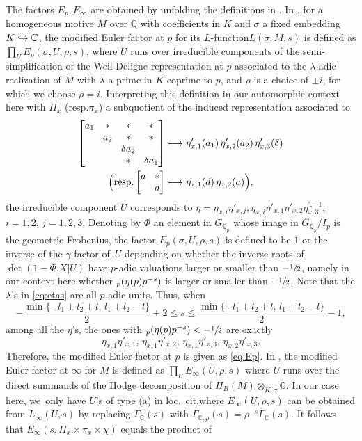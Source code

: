 \documentclass[10pt]{amsart}
\newcommand{\resp}{resp.}
\newcommand{\loccit}{loc.\ cit.}
\newcommand{\NoChangel}[1]{%
\expandafter\let\csname old\string#1\endcsname=#1
\let#1=\relax
\newcommand{#1}{\mathop{\mathcode`l="716C\csname old\string#1\endcsname\mathcode`l="7160}\displaylimits}%
}
\newcommand\mto{\mathchoice{\longmapsto}{\mapsto}{\mapsto}{\mapsto}}
\newcommand\hto{\mathrel{\lhook\joinrel\to}}
\newcommand{\Lfunction}{$L$\nobreakdash-func\-tion\xspace}
\theoremstyle{plain}
\theoremstyle{remark}
\newcommand{\bC}{\mathbb{C}}
\newcommand{\bQ}{\mathbb{Q}}
\newcommand{\val}{\mathrm{val}}\NoChangel{\val}
\begin{document}
The factors $E_p,E_\infty$ are obtained by unfolding the definitions in \cite{CoPerrin,Coates}. In \cite[p.\,163]{Coates}, for a homogeneous motive $M$ over $\bQ$ with coefficients in $K$ and $\sigma$ a fixed embedding $K\hto\bC$, the modified Euler factor at $p$ for its \Lfunction $L(\sigma,M,s)$ is defined as $\prod\nolimits_{U} E_p(\sigma,U,\rho,s)$, where $U$ runs over irreducible components of the semi-simplification of the Weil-Deligne representation at $p$ associated to the $\lambda$-adic realization of $M$ with $\lambda$ a prime in $K$ coprime to $p$, and $\rho$ is a choice of $\pm i$, for which we choose $\rho=i$. Interpreting this definition in our automorphic context here with $\Pi_x$ (\resp $\pi_x$) a subquotient of the induced representation associated to
\begin{align*}\arraycolsep4.5pt
\begin{bmatrix} a_1&\ast&\ast&\ast\\& a_2&\ast&\ast\\ &&\delta a_2\\&&\ast&\delta a_1\end{bmatrix}&\mto \eta'_{x,1}(a_1)\,\eta'_{x,2}(a_2)\,\eta'_{x,3}(\delta)\\
\arraycolsep4.5pt
\Bigl(\text{\resp }\begin{bmatrix}a&\ast\\&d\end{bmatrix}&\mto \eta_{x,1}(d)\,\eta_{x,2}(a)\Bigr),
\end{align*}
the irreducible component $U$ corresponds to $\eta=\eta_{x,i}\eta'_{x,j},\eta_{x,i}\eta'_{x,1}\eta'_{x,2}\eta^{\prime,-1}_{x,3}$, $i=1,2$, $j=1,2,3$. Denoting by $\Phi$ an element in $G_{\bQ_p}$ whose image in $G_{\bQ_p}/I_p$ is the geometric Frobenius, the factor $E_p(\sigma,U,\rho,s)$ is defined to be $1$ or the inverse of the $\gamma$-factor of~$U$ depending on whether the inverse roots of $\det(1-\Phi.X|U)$ have $p$-adic valuations larger or smaller than $-\sfrac{1}{2}$, namely in our context here whether $\val_p(\eta(p)p^{-s})$ is larger or smaller than $-\sfrac{1}{2}$. Note that the $\lambda$'s in \eqref{eq:etas} are all $p$-adic units. Thus, when
\[
-\frac{\min\{-l_1+l_2+l,\,l_1+l_2-l\}}{2}+2 \leq s\leq \frac{\min\{-l_1+l_2+l,\,l_1+l_2-l\}}{2}-1,
\]
among all the $\eta$'s, the ones with $\val_p(\eta(p)p^{-s})<-\sfrac{1}{2}$ are exactly
\[
\eta_{x,1}\eta'_{x,1},\,\eta_{x,1}\eta'_{x,2},\,\eta_{x,1}\eta'_{x,3},\,\eta_{x,2}\eta'_{x,3}.
\]
Therefore, the modified Euler factor at $p$ is given as \eqref{eq:Ep}. In \cite[(38) on p.\,157]{Coates}, the modified Euler factor at $\infty$ for $M$ is defined as $\prod_U E_\infty(U,\rho,s)$ where $U$ runs over the direct summands of the Hodge decomposition of $H_B(M)\otimes_{K,\sigma}\bC$. In our case here, we~only have $U$'s of type (a) in \loccit where $E_\infty(U,\rho,s)$ can be obtained from $L_\infty(U,s)$ by replacing $\Gamma_\bC(s)$ with $\Gamma_{\bC,\rho}(s)=\rho^{-s}\Gamma_\bC(s)$. It follows that \hbox{$E_\infty(s,\Pi_x\times\pi_x\times\chi)$} equals the product of\enlargethispage{-2\baselineskip}
\end{document}
